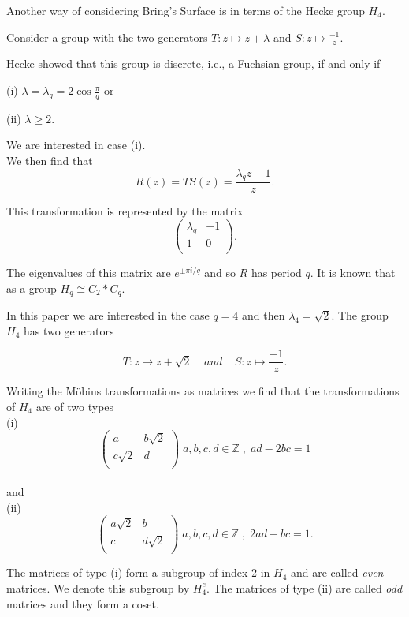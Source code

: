 \documentclass{amsproc}
\numberwithin{equation}{section}
\numberwithin{equation}{section}
\theoremstyle{definition}
\theoremstyle{remark}
\numberwithin{equation}{section}
\begin{document}
Another way of considering Bring's Surface is  in terms of the Hecke group $H_4$.

Consider a group with the two generators $T: z\mapsto z+\lambda$ and $S: z\mapsto \frac{-1}{z}$.

Hecke showed that this group is discrete, i.e., a Fuchsian group, if and only if 


(i) $\lambda=\lambda_q=2\cos \frac{\pi}{q}$ or 

(ii) $\lambda\ge 2$.
  \vspace{0.2cm}

We are interested in case (i).\\

We then find that $$R(z)=TS(z)=\frac{\lambda_q z-1}{z}.$$

This transformation is represented by the matrix 
$$\begin{pmatrix}\lambda_q&-1\\1&0\\\end{pmatrix}.$$

The eigenvalues of this matrix are $e^{\pm \pi i/q}$ and so $R$ has period $q$.  It is known that as a group  $H_q\cong C_2*C_q$.
  \vspace{0.2cm}

In this paper we are interested in the case  $q=4$ and then $\lambda_4=\sqrt 2$.
  The group $H_4$ has two generators 
  
 $$T:z\mapsto z+\sqrt 2 \;\;\;\;and\;\;\;\;  S: z\mapsto \frac{-1}{z}.$$
 
  Writing the M\"obius transformations as matrices we find that the transformations of $H_4$ are of two types\\
 (i) $$\begin{pmatrix}a&b\sqrt 2\\c\sqrt 2& d\\ \end{pmatrix}  \;  a,b,c,d \in \mathbb{Z} \;,\; ad-2bc=1$$ \\ and\\(ii) $$\begin{pmatrix}a\sqrt 2&b\\c&d\sqrt 2\\ \end{pmatrix}\;  a,b,c,d \in \mathbb{Z} \;,\; 2ad-bc=1.$$
 
 The matrices of type (i) form a subgroup of index 2 in $H_4$ and are called {\it even} matrices.  We denote this subgroup by $H_{4}^{e}$.
 The matrices of type (ii) are called {\it odd} matrices and they form a coset.
\end{document}

